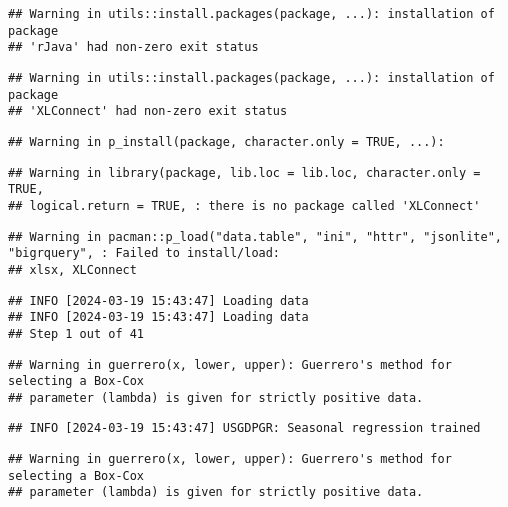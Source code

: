 \documentclass[
]{article}
\begin{document}
\begin{verbatim}
## Warning in utils::install.packages(package, ...): installation of package
## 'rJava' had non-zero exit status
\end{verbatim}

\begin{verbatim}
## Warning in utils::install.packages(package, ...): installation of package
## 'XLConnect' had non-zero exit status
\end{verbatim}

\begin{verbatim}
## Warning in p_install(package, character.only = TRUE, ...):
\end{verbatim}

\begin{verbatim}
## Warning in library(package, lib.loc = lib.loc, character.only = TRUE,
## logical.return = TRUE, : there is no package called 'XLConnect'
\end{verbatim}

\begin{verbatim}
## Warning in pacman::p_load("data.table", "ini", "httr", "jsonlite", "bigrquery", : Failed to install/load:
## xlsx, XLConnect
\end{verbatim}

\begin{verbatim}
## INFO [2024-03-19 15:43:47] Loading data
## INFO [2024-03-19 15:43:47] Loading data
## Step 1 out of 41
\end{verbatim}

\begin{verbatim}
## Warning in guerrero(x, lower, upper): Guerrero's method for selecting a Box-Cox
## parameter (lambda) is given for strictly positive data.
\end{verbatim}

\begin{verbatim}
## INFO [2024-03-19 15:43:47] USGDPGR: Seasonal regression trained
\end{verbatim}

\begin{verbatim}
## Warning in guerrero(x, lower, upper): Guerrero's method for selecting a Box-Cox
## parameter (lambda) is given for strictly positive data.
\end{verbatim}
\end{document}
